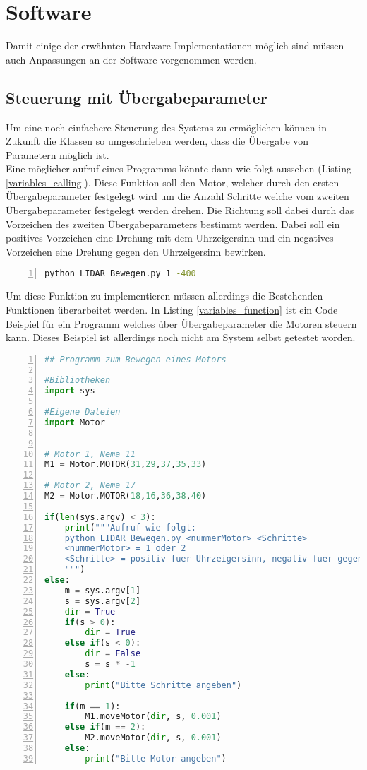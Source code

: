 \section{Software}
Damit einige der erwähnten Hardware Implementationen möglich sind müssen auch Anpassungen an der Software vorgenommen werden.
\subsection{Steuerung mit Übergabeparameter}
Um eine noch einfachere Steuerung des Systems zu ermöglichen können in Zukunft die Klassen so umgeschrieben werden, dass die Übergabe von Parametern möglich ist.\\
Eine möglicher aufruf eines Programms könnte dann wie folgt aussehen (Listing \ref{variables_calling}). Diese Funktion soll den Motor, welcher durch den ersten Übergabeparameter festgelegt wird um die Anzahl Schritte welche vom zweiten Übergabeparameter festgelegt werden drehen. Die Richtung soll dabei durch das Vorzeichen des zweiten Übergabeparameters bestimmt werden. Dabei soll ein positives Vorzeichen eine Drehung mit dem Uhrzeigersinn und ein negatives Vorzeichen eine Drehung gegen den Uhrzeigersinn bewirken.
\begin{lstlisting}[caption={Beispiel Aufruf einer Python Funktion mit Übergabeparametern}, language={bash}, label={variables_calling}, numbers=left]
python LIDAR_Bewegen.py 1 -400
\end{lstlisting}
Um diese Funktion zu implementieren müssen allerdings die Bestehenden Funktionen überarbeitet werden. In Listing \ref{variables_function} ist ein Code Beispiel für ein Programm welches über Übergabeparameter die Motoren steuern kann. Dieses Beispiel ist allerdings noch nicht am System selbst getestet worden. 
\begin{lstlisting}[caption={Python Beispiel Funktion welche Übergabeparamenter akzeptiert und ausführt}, language={python}, label={variables_function}, numbers=left]
## Programm zum Bewegen eines Motors

#Bibliotheken
import sys

#Eigene Dateien
import Motor


# Motor 1, Nema 11
M1 = Motor.MOTOR(31,29,37,35,33)

# Motor 2, Nema 17
M2 = Motor.MOTOR(18,16,36,38,40)

if(len(sys.argv) < 3):
    print("""Aufruf wie folgt:
    python LIDAR_Bewegen.py <nummerMotor> <Schritte>
    <nummerMotor> = 1 oder 2
    <Schritte> = positiv fuer Uhrzeigersinn, negativ fuer gegen den Uhrzeigersinn
    """)
else:
    m = sys.argv[1]
    s = sys.argv[2]
    dir = True
    if(s > 0):
        dir = True
    else if(s < 0):
        dir = False
        s = s * -1
    else:
        print("Bitte Schritte angeben")

    if(m == 1):
        M1.moveMotor(dir, s, 0.001)
    else if(m == 2):
        M2.moveMotor(dir, s, 0.001)
    else:
        print("Bitte Motor angeben")

\end{lstlisting}
